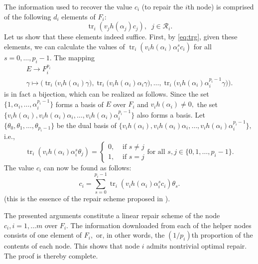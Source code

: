 \documentclass[11pt,onecolumn]{IEEEtran}
\newcommand{\cR}{\mathcal{R}}
\DeclareMathOperator{\trace}{tr}
\begin{document}
\begin{IEEEproof}
The information used to recover the value $c_i$ (to repair the $i$th node) is comprised of the following $d_i$ elements of $F_i:$
   $$
   \trace_i(v_j h(\alpha_j) c_j), \;\;j\in\cR_i.
   $$
Let us show that these elements indeed suffice. First, by \eqref{eq:trg}, given these elements, we can calculate
the values of $\trace_{i}(v_i h(\alpha_i) \alpha_i^s c_i)$
for all $s=0,\dots,p_i-1.$ The mapping  
   $$
   \begin{array}{ll}
   E\to F_i^{p_i}\\
\gamma \mapsto \big(\trace_{i} \big(v_ih(\alpha_i)\gamma \big), 
\trace_{i} \big( v_i h(\alpha_i)\alpha_i \gamma \big) , \dots, 
\trace_{i} \big( v_i h(\alpha_i) \alpha_i^{p_i-1} \gamma \big) \big).
  \end{array}
   $$ 
is in fact a bijection, which can be realized as follows. Since the set $\{1,\alpha_i,\dots,\alpha_i^{p_i-1}\}$  forms a basis of $E$ over $F_i$
and $v_i h(\alpha_i) \neq 0,$ the set $\{v_i h(\alpha_i), v_i h(\alpha_i)\alpha_i,\dots, v_i h(\alpha_i)\alpha_i^{p_i-1}\}$
also forms a basis. 
{Let $\{ \theta_0, \theta_1, \dots, \theta_{p_i-1} \}$ be the dual basis of $\{v_i h(\alpha_i), v_i h(\alpha_i)\alpha_i,\dots, v_i h(\alpha_i)\alpha_i^{p_i-1}\},$ i.e., 
$$
\trace_i(v_i h(\alpha_i)\alpha_i^s  \theta_j) = \left\{
\begin{array}{cc}
0, & \text{~if~} s \neq j \\
1, & \text{~if~} s = j 
\end{array} \right. 
\text{for all~} s,j\in\{0,1,\dots,p_i-1\}.
$$
The value $c_i$ can now be found as follows:
$$
c_i= \sum_{s=0}^{p_i-1} \trace_i(v_i h(\alpha_i)\alpha_i^s c_i) \theta_s.
$$}
 (this is the essence of the repair scheme
proposed in \cite{Guruswami16}). 

The presented arguments constitute a linear repair scheme of the node $c_i, i=1,\dots m$ over $F_i.$ 
The information downloaded from each of the helper nodes consists of one element
of $F_i,$ or, in other words, the $(1/p_i)$th proportion of the contents of each node.
This shows that node $i$ admits nontrivial optimal repair. 
The proof is thereby complete.
\end{IEEEproof}	
\end{document}
